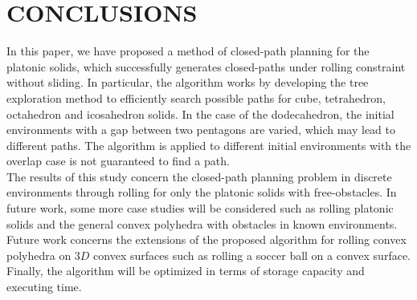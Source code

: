 \clearpage
\newpage
\section{CONCLUSIONS}
%
\noindent In this paper, we have proposed a method of closed-path planning for the platonic solids, which successfully generates closed-paths under rolling constraint without sliding. 
%
In particular, the algorithm works by developing the tree exploration method to efficiently search possible paths for cube, tetrahedron, octahedron and icosahedron solids. 
%
In the case of the dodecahedron, the initial environments with a gap between two pentagons are varied, which may lead to different paths. 
The algorithm is applied to different initial environments with the overlap case is not guaranteed to find a path.\\


\noindent The results of this study concern the closed-path planning problem in discrete environments through rolling for only the platonic solids with free-obstacles.
In future work, some more case studies will be considered such as rolling platonic solids and the general convex polyhedra with obstacles in known environments. 
Future work concerns the extensions of the proposed algorithm for rolling convex polyhedra on $3D$ convex surfaces such as rolling a soccer ball on a convex surface.  
Finally, the algorithm will be optimized in terms of storage capacity and executing time. \\

